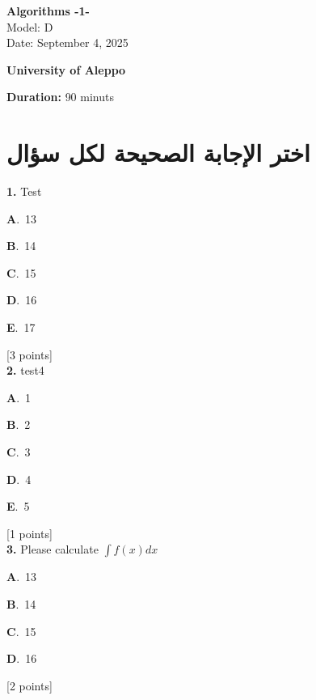 \documentclass[12pt]{article}
\newcommand{\choice}[3]{%
  \noindent\textbf{#1}.~#2\hfill#3\par\vspace{0.25em}
}
\begin{document}
\begin{flushright}
{\Large \textbf{{\textenglish{Algorithms -1-}}}}\\[0.25em]
{\normalsize \textenglish{Model: }{\textenglish{D}}}\\[0.1em]
{\normalsize \textenglish{Date: }{\textenglish{September 4, 2025}}}
\end{flushright}

\vspace{0.6cm}

\noindent
\begin{minipage}[t]{0.65\textwidth}
  \raggedright
  \textbf{{\textenglish{University of Aleppo}}}\\[0.3em]
\end{minipage}\hfill
\begin{minipage}[t]{0.3\textwidth}
  \raggedleft
  \textenglish{\textbf{Duration: }}{\textenglish{90 minuts}}
\end{minipage}

\vspace{0.9cm}

\section*{اختر الإجابة الصحيحة لكل سؤال}

\noindent \textbf{\textenglish{1.}} {\textenglish{Test}}

\noindent\choice{A}{{\textenglish{13}}}{}
\noindent\choice{B}{{\textenglish{14}}}{}
\noindent\choice{C}{{\textenglish{15}}}{}
\noindent\choice{D}{{\textenglish{16}}}{}
\noindent\choice{E}{{\textenglish{17}}}{}
\hfill {\textenglish{[3 points]}}\\[0.5em]

\noindent \textbf{\textenglish{2.}} {\textenglish{test4}}

\noindent\choice{A}{{\textenglish{1}}}{}
\noindent\choice{B}{{\textenglish{2}}}{}
\noindent\choice{C}{{\textenglish{3}}}{}
\noindent\choice{D}{{\textenglish{4}}}{}
\noindent\choice{E}{{\textenglish{5}}}{}
\hfill {\textenglish{[1 points]}}\\[0.5em]

\noindent \textbf{\textenglish{3.}} {\textenglish{Please calculate }}\(\int f(x)dx\)

\noindent\choice{A}{{\textenglish{13}}}{}
\noindent\choice{B}{{\textenglish{14}}}{}
\noindent\choice{C}{{\textenglish{15}}}{}
\noindent\choice{D}{{\textenglish{16}}}{}
\hfill {\textenglish{[2 points]}}\\[0.5em]
\end{document}
